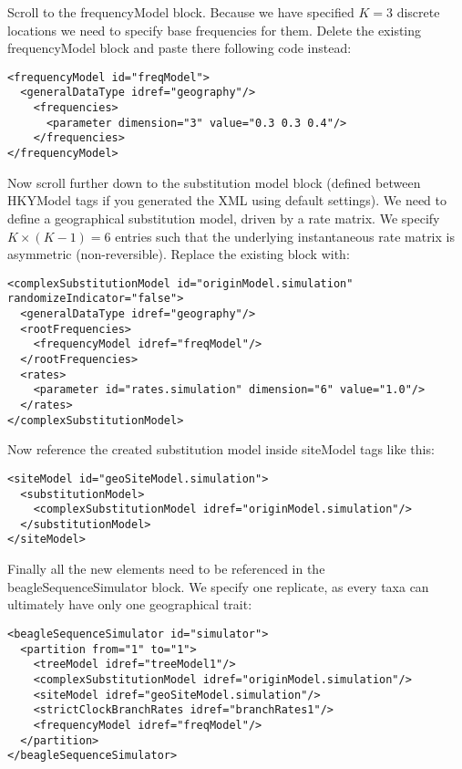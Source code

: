 Scroll to the {\color{darkblue}frequencyModel} block. Because we have specified $K=3$ discrete locations we need to specify base frequencies for them. Delete the existing {\color{darkblue}frequencyModel} block and paste there following code instead:

\begin{lstlisting}
<frequencyModel id="freqModel">
  <generalDataType idref="geography"/>
    <frequencies>
      <parameter dimension="3" value="0.3 0.3 0.4"/>
    </frequencies>
</frequencyModel>
\end{lstlisting}

Now scroll further down to the substitution model block (defined between {\color{darkblue}HKYModel} tags if you generated the XML using default settings). 
We need to define a geographical substitution model, driven by a rate matrix. 
We specify $K\times(K-1)=6$ entries such that the underlying instantaneous rate matrix is asymmetric (non-reversible). 
Replace the existing block with: 

\begin{lstlisting}
<complexSubstitutionModel id="originModel.simulation" randomizeIndicator="false">
  <generalDataType idref="geography"/>
  <rootFrequencies>
    <frequencyModel idref="freqModel"/>
  </rootFrequencies>
  <rates>
    <parameter id="rates.simulation" dimension="6" value="1.0"/>
  </rates>
</complexSubstitutionModel>
\end{lstlisting}

Now reference the created substitution model inside {\color{darkblue}siteModel} tags like this:

\begin{lstlisting}
<siteModel id="geoSiteModel.simulation">
  <substitutionModel>
    <complexSubstitutionModel idref="originModel.simulation"/>
  </substitutionModel>
</siteModel>
\end{lstlisting}

Finally all the new elements need to be referenced in the {\color{darkblue}beagleSequenceSimulator} block. We specify one replicate, as every taxa can ultimately have only one geographical trait:

\begin{lstlisting}
<beagleSequenceSimulator id="simulator">
  <partition from="1" to="1"> 
    <treeModel idref="treeModel1"/>
    <complexSubstitutionModel idref="originModel.simulation"/>	    
    <siteModel idref="geoSiteModel.simulation"/>
    <strictClockBranchRates idref="branchRates1"/>
    <frequencyModel idref="freqModel"/>
  </partition>
</beagleSequenceSimulator>
\end{lstlisting}

